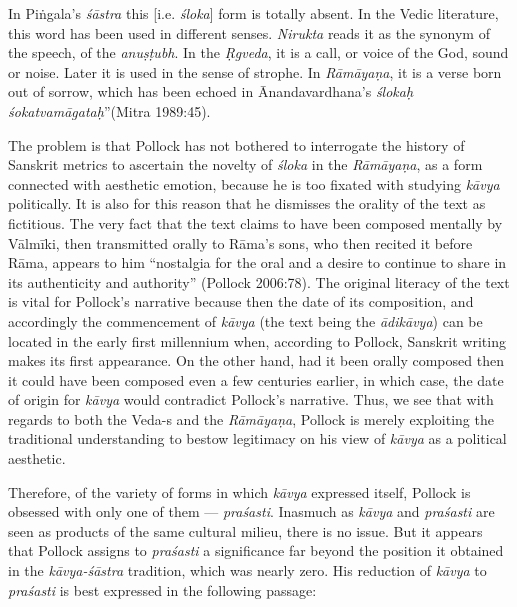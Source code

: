 \begin{myquote}
In Piṅgala's \textsl{śāstra} this [i.e. \textsl{śloka}] form is totally absent. In the Vedic literature, this word has been used in different senses. \textsl{Nirukta} reads it as the synonym of the speech, of the \textsl{anuṣṭubh}. In the \textsl{Ṛgveda}, it is a call, or voice of the God, sound or noise. Later it is used in the sense of strophe. In \textsl{Rāmāyaṇa}, it is a verse born out of sorrow, which has been echoed in Ānandavardhana's \textsl{ślokaḥ śokatvamāgataḥ}''\hfill (Mitra 1989:45).
\end{myquote}
\vskip 1pt

The problem is that Pollock has not bothered to interrogate the history of Sanskrit metrics to ascertain the novelty of \textsl{śloka} in the \textsl{Rāmāyaṇa}, as a form connected with aesthetic emotion, because he is too fixated with studying \textsl{kāvya} politically. It is also for this reason that he dismisses the orality of the text as fictitious. The very fact that the text claims to have been composed mentally by Vālmīki, then transmitted orally to Rāma's sons, who then recited it before Rāma, appears to him ``nostalgia for the oral and a desire to continue to share in its authenticity and authority'' (Pollock 2006:78). The original literacy of the text is vital for Pollock's narrative because then the date of its composition, and accordingly the commencement of \textsl{kāvya} (the text being the \textsl{ādikāvya}) can be located in the early first millennium when, according to Pollock, Sanskrit writing makes its first appearance. On the other hand, had it been orally composed then it could have been composed even a few centuries earlier, in which case, the date of origin for \textsl{kāvya} would contradict Pollock's narrative. Thus, we see that with regards to both the Veda-s and the \textsl{Rāmāyaṇa}, Pollock is merely exploiting the traditional understanding to bestow legitimacy on his view of \textsl{kāvya} as a political aesthetic.

Therefore, of the variety of forms in which \textsl{kāvya} expressed itself, Pollock is obsessed with only one of them --- \textsl{praśasti}. Inasmuch as \textsl{kāvya} and \textsl{praśasti} are seen as products of the same cultural milieu, there is no issue. But it appears that Pollock assigns to \textsl{praśasti} a significance far beyond the position it obtained in the \textsl{kāvya-śāstra} tradition, which was nearly zero. His reduction of \textsl{kāvya} to \textsl{praśasti} is best expressed in the following passage:

